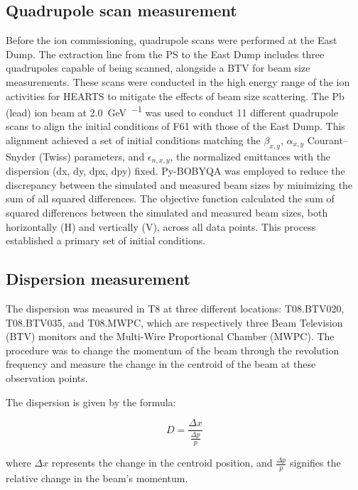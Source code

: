\documentclass[a4paper,
               biblatex,     %
               ]{jacow}
\begin{document}
\subsection{Quadrupole scan measurement}

Before the ion commissioning, quadrupole scans were performed at the East Dump. The extraction line from the PS to the East Dump includes three quadrupoles capable of being scanned, alongside a BTV for beam size measurements. These scans were conducted in the high energy range of the ion activities for HEARTS to mitigate the effects of beam size scattering. The Pb (lead) ion beam at \SI{2.0}{\giga\electronvolt\per\nucleon} was used to conduct 11 different quadrupole scans to align the initial conditions of F61 with those of the East Dump. This alignment achieved a set of initial conditions matching the $\beta_{x,y}$, $\alpha_{x,y}$ Courant–Snyder (Twiss) parameters, and $\epsilon_{n,x,y}$, the normalized emittances with the dispersion (dx, dy, dpx, dpy) fixed. Py-BOBYQA \cite{cartis_escaping_2022, cartis_improving_2019} was employed to reduce the discrepancy between the simulated and measured beam sizes by minimizing the sum of all squared differences. The objective function calculated the sum of squared differences between the simulated and measured beam sizes, both horizontally (H) and vertically (V), across all data points. This process established a primary set of initial conditions.


\subsection{Dispersion measurement}

The dispersion was measured in T8 at three different locations: T08.BTV020, T08.BTV035, and T08.MWPC, which are respectively three Beam Television (BTV) monitors and the Multi-Wire Proportional Chamber (MWPC). The procedure was to change the momentum of the beam through the revolution frequency and measure the change in the centroid of the beam at these observation points.

The dispersion is given by the formula:

\begin{equation}
D = \frac{\Delta x}{\frac{\Delta p}{p}}
\end{equation}

where $\Delta x$ represents the change in the centroid position, and $\frac{\Delta p}{p}$ signifies the relative change in the beam's momentum.
\end{document}
